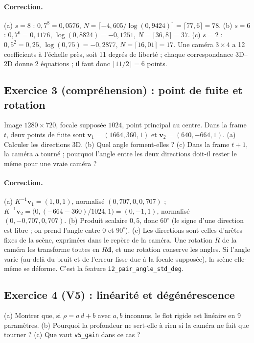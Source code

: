 \documentclass[11pt,a4paper]{article}
\begin{document}
\paragraph{Correction.}
(a) $s=8$ : $0{,}7^8=0{,}0576$, $N=\lceil-4{,}605/\log(0{,}9424)\rceil=\lceil77{,}6\rceil=78$.
(b) $s=6$ : $0{,}7^6=0{,}1176$, $\log(0{,}8824)=-0{,}1251$, $N=\lceil36{,}8\rceil=37$.
(c) $s=2$ : $0{,}5^2=0{,}25$, $\log(0{,}75)=-0{,}2877$, $N=\lceil16{,}01\rceil=17$.
Une caméra $3\times4$ a 12 coefficients à l'échelle près, soit 11 degrés de liberté ; chaque
correspondance 3D--2D donne 2 équations ; il faut donc $\lceil11/2\rceil=6$ points.

\subsection*{Exercice 3 (compréhension) : point de fuite et rotation}
Image $1280\times720$, focale supposée $1024$, point principal au centre. Dans la frame $t$, deux points
de fuite sont $\mathbf v_1=(1664,360,1)$ et $\mathbf v_2=(640,-664,1)$. (a) Calculer les directions 3D.
(b) Quel angle forment-elles ? (c) Dans la frame $t+1$, la caméra a tourné ; pourquoi l'angle entre les
deux directions doit-il rester le même pour une vraie caméra ?

\paragraph{Correction.}
(a) $K^{-1}\mathbf v_1=(1,0,1)$, normalisé $(0{,}707,0,0{,}707)$ ;
$K^{-1}\mathbf v_2=\bigl(0,(-664-360)/1024,1\bigr)=(0,-1,1)$, normalisé $(0,-0{,}707,0{,}707)$.
(b) Produit scalaire $0{,}5$, donc $60^\circ$ (le signe d'une direction est libre ; on prend l'angle
entre 0 et $90^\circ$).
(c) Les directions sont celles d'arêtes fixes de la scène, exprimées dans le repère de la caméra. Une
rotation $R$ de la caméra les transforme toutes en $R\mathbf d$, et une rotation conserve les angles.
Si l'angle varie (au-delà du bruit et de l'erreur lisse due à la focale supposée), la scène elle-même
se déforme. C'est la feature \texttt{i2\_pair\_angle\_std\_deg}.

\subsection*{Exercice 4 (V5) : linéarité et dégénérescence}
(a) Montrer que, si $\rho=a\,d+b$ avec $a,b$ inconnus, le flot rigide est linéaire en 9 paramètres.
(b) Pourquoi la profondeur ne sert-elle à rien si la caméra ne fait que tourner ? (c) Que vaut
\texttt{v5\_gain} dans ce cas ?
\end{document}
